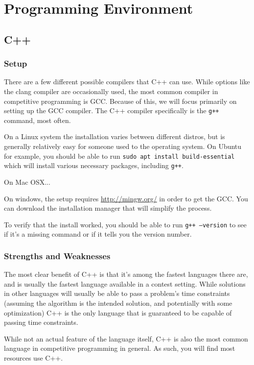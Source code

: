 \section{Programming Environment}

\subsection{C++}

\subsubsection{Setup}

There are a few different possible compilers that C++ can use. While options like the clang compiler are occasionally used, the most common compiler in competitive programming is GCC. Because of this, we will focus primarily on setting up the GCC compiler. The C++ compiler specifically is the \texttt{g++} command, most often.

On a Linux system the installation varies between different distros, but is generally relatively easy for someone used to the operating system. On Ubuntu for example, you should be able to run \texttt{sudo apt install build-essential} which will install various necessary packages, including \texttt{g++}.

On Mac OSX...

On windows, the setup requires \url{http://mingw.org/} in order to get the GCC. You can download the installation manager that will simplify the process.

To verify that the install worked, you should be able to run \texttt{g++ --version} to see if it's a missing command or if it tells you the version number.

\subsubsection{Strengths and Weaknesses}

The most clear benefit of C++ is that it's among the fastest languages there are, and is usually the fastest language available in a contest setting. While solutions in other languages will usually be able to pass a problem's time constraints (assuming the algorithm is the intended solution, and potentially with some optimization) C++ is the only language that is guaranteed to be capable of passing time constraints.

While not an actual feature of the language itself, C++ is also the most common language in competitive programming in general. As such, you will find most resources use C++.

